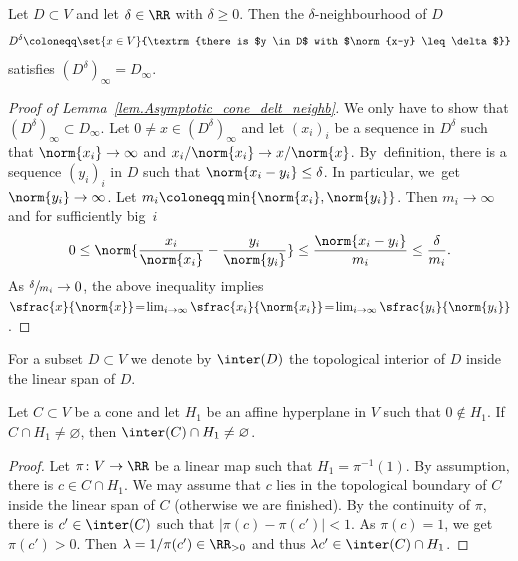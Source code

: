 \begin{lemma}
\label{lem.Asymptotic_cone_delt_neighb}
Let $D \subset V$ and let $\delta \in \RR$ with $\delta \geq 0$. Then
the $\delta$-neighbourhood of $D$
\[
D^{\delta} \coloneqq \set{x \in V}{\textrm{there is $y \in D$ with $\norm{x-y} \leq \delta$}}
\]
satisfies $(D^{\delta})_{\infty} = D_{\infty}$.
\end{lemma}

\begin{proof}[Proof of Lemma~\ref{lem.Asymptotic_cone_delt_neighb}]
We only have to show that $(D^{\delta})_{\infty} \subset D_{\infty}$. Let
$0 \neq x \in (D^{\delta})_{\infty}$ and let
$(x_i)_i$ be a sequence
in $D^{\delta}$ such that $\norm{x_i} \to \infty$ and $x_i / \norm{x_i} \to x / \norm{x}$.
By~definition,
there is a sequence $(y_i)_i$ in $D$ such that $\norm{x_i-y_i} \leq \delta$. In particular, we~get
$\norm{y_i} \to \infty$. Let $m_i \coloneqq \min\{\norm{x_i}, \norm{y_i}\}$. Then $m_i \to \infty$
and for sufficiently big~$i$
\[
0 \leq \norm{\frac{x_i}{\norm{x_i}}-\frac{y_i}{\norm{y_i}}} \leq \frac{\norm{x_i-y_i}}{m_i} \leq \frac{\delta}{m_i}.
\]
As $\sfrac{\delta}{m_i} \to 0$, the above inequality
implies
$\sfrac{x}{\norm{x}}\!=\!\lim_{i \to \infty} \sfrac{x_i}{\norm{x_i}}\!=\!\lim_{i \to \infty} \sfrac{y_i}{\norm{y_i}}$.
\end{proof}

For a subset $D \subset V$ we denote by $\inter(D)$ the topological interior
of $D$ inside the linear span of $D$.

\begin{lemma}
\label{lem.Intersection_with_affine_hyperplane}
Let $C \subset V$ be a cone and let $H_1$ be an affine hyperplane in $V$
such that $0 \not\in H_1$. If $C \cap H_1 \neq \varnothing$, then $\inter(C) \cap H_1 \neq \varnothing$.
\end{lemma}

\begin{proof}
Let $\pi \colon V \to \RR$ be a linear map such that $H_1 = \pi^{-1}(1)$.
By assumption, there is $c \in C \cap H_1$.
We may assume that $c$ lies in the topological boundary of $C$ inside the linear span of $C$
(otherwise we are finished).
By the continuity
of $\pi$, there is $c' \in \inter(C)$ such that $|\pi(c)- \pi(c')| < 1$. As $\pi(c) = 1$, we
get $\pi(c') > 0$. Then $\lambda = 1 / \pi(c') \in \RR_{> 0}$ and thus
$\lambda c' \in \inter(C) \cap H_1$.
\end{proof}

